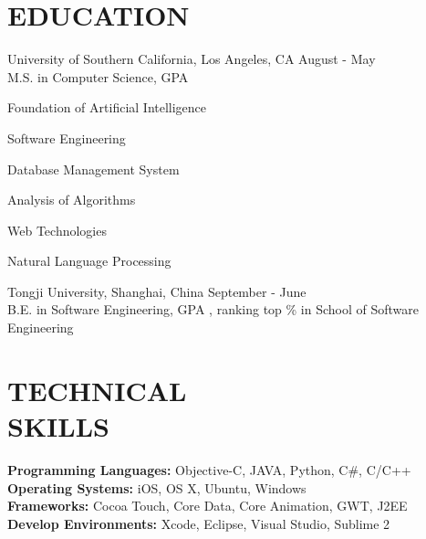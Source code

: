 \documentclass[line, overlapped]{res}
\begin{document}
 

\address{ W th Pl Apt., Los Angeles, CA } 
\address{() -, haishany@usc.edu, gitub.com/gabrielyeah}

 
\begin{resume} 

\section{EDUCATION} 
University of Southern California, Los Angeles, CA \hfill August  - May  \\
M.S. in Computer Science, GPA  \\ [-10pt]
\begin{multicols}{3}
  \begin{compactitem}[$\circ$]
    \item Foundation of Artificial Intelligence
    \item Software Engineering
    \item Database Management System
    \item Analysis of Algorithms
    \item Web Technologies
    \item Natural Language Processing
  \end{compactitem} 
\end{multicols}

Tongji University, Shanghai, China \hfill September  - June  \\
B.E. in Software Engineering, GPA , ranking top \% in School of Software Engineering

\section{TECHNICAL \\ SKILLS}
{\bf Programming Languages:} \hspace{10 pt}Objective-C, JAVA, Python, C\#, C/C++\\
{\bf Operating Systems:} \hspace{38 pt}iOS, OS X, Ubuntu, Windows \\
{\bf Frameworks:} \hspace{66 pt}Cocoa Touch, Core Data, Core Animation, GWT, J2EE \\
{\bf Develop Environments:}  \hspace{21 pt}Xcode, Eclipse, Visual Studio, Sublime 2 \\


\end{resume}
\end{document}
